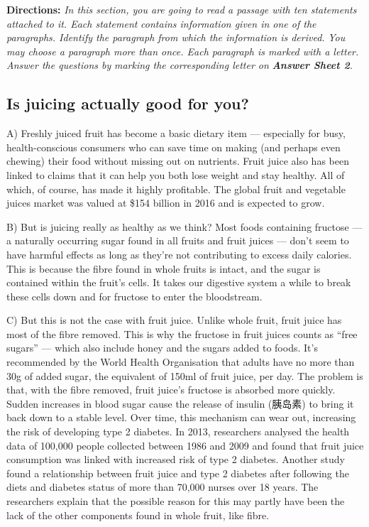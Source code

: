 \documentclass[UTF8,11pt]{ctexart}
\begin{document}
\textbf{Directions:} \textit{In this section, you are going to read a passage with ten statements attached to it. Each statement} \textit{contains information given in one of the paragraphs. Identify the paragraph from which the information is derived.} \textit{You may choose a paragraph more than once. Each paragraph is marked with a letter. Answer the questions by} \textit{marking the corresponding letter on }\textbf{\textit{Answer Sheet 2}}\textit{.}


\subsection*{\textbf{Is juicing actually good for you?}}


A) Freshly juiced fruit has become a basic dietary item — especially for busy, health-conscious consumers who can save time on making (and perhaps even chewing) their food without missing out on nutrients. Fruit juice also has been linked to claims that it can help you both lose weight and stay healthy. All of which, of course, has made it highly profitable. The global fruit and vegetable juices market was valued at \$154 billion in 2016 and is expected to grow.


B) But is juicing really as healthy as we think? Most foods containing fructose — a naturally occurring sugar found in all fruits and fruit juices — don’t seem to have harmful effects as long as they’re not contributing to excess daily calories. This is because the fibre found in whole fruits is intact, and the sugar is contained within the fruit’s cells. It takes our digestive system a while to break these cells down and for fructose to enter the bloodstream.


C) But this is not the case with fruit juice. Unlike whole fruit, fruit juice has most of the fibre removed. This is why the fructose in fruit juices counts as “free sugars” — which also include honey and the sugars added to foods. It’s recommended by the World Health Organisation that adults have no more than 30g of added sugar, the equivalent of 150ml of fruit juice, per day. The problem is that, with the fibre removed, fruit juice’s fructose is absorbed more quickly. Sudden increases in blood sugar cause the release of insulin (胰岛素) to bring it back down to a stable level. Over time, this mechanism can wear out, increasing the risk of developing type 2 diabetes. In 2013, researchers analysed the health data of 100,000 people collected between 1986 and 2009 and found that fruit juice consumption was linked with increased risk of type 2 diabetes. Another study found a relationship between fruit juice and type 2 diabetes after following the diets and diabetes status of more than 70,000 nurses over 18 years. The researchers explain that the possible reason for this may partly have been the lack of the other components found in whole fruit, like fibre.
\end{document}
